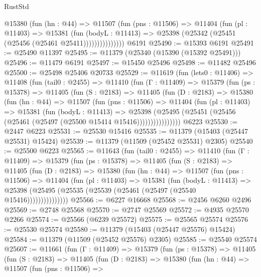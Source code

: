 \begin{lexlean}{RustStd}
\begin{coremodule}
                @15380
                  (fun (hn : @44) =>
                  @11507
                    (fun (pns : @11506) =>
                    @11404
                      (fun (pl : @11403) =>
                      @15381
                        (fun (bodyL : @11413) =>
                        @25398 (@25342 (@25451 (@25456 (@25461 @25411)))))))))))))))
    @6191
@25490 := @15393 @6191
@25491 := @25490 @11397
@25495 := @11379 (@25340 (@15390 (@15392 @25491)))
@25496 := @11479 @6191
@25497 := @15450 @25496
@25498 := @11482 @25496
@25500 := @25498 @25406 @20733
@25529 := @11619
    (fun (lets0 : @11406) =>
    @11408
      (fun (tail0 : @2455) =>
      @11410
        (fun (Γ : @11409) =>
        @15379
          (fun (ps : @15378) =>
          @11405
            (fun (S : @2183) =>
            @11405
              (fun (D : @2183) =>
              @15380
                (fun (hn : @44) =>
                @11507
                  (fun (pns : @11506) =>
                  @11404
                    (fun (pl : @11403) =>
                    @15381
                      (fun (bodyL : @11413) =>
                      @25398
                        (@25495
                          (@25451 (@25456 (@25461 (@25497 (@25500 @15414 @15416))))))))))))))))
    @6223
@25530 := @2447 @6223
@25531 := @25530 @15416
@25535 := @11379 (@15403 (@25447 @25531) @15424)
@25539 := @11379 (@11509 (@25452 @25531) @2305)
@25540 := @25500 @6223
@25565 := @11643
    (fun (tail0 : @2455) =>
    @11410
      (fun (Γ : @11409) =>
      @15379
        (fun (ps : @15378) =>
        @11405
          (fun (S : @2183) =>
          @11405
            (fun (D : @2183) =>
            @15380
              (fun (hn : @44) =>
              @11507
                (fun (pns : @11506) =>
                @11404
                  (fun (pl : @11403) =>
                  @15381
                    (fun (bodyL : @11413) =>
                    @25398 (@25495 (@25535 (@25539 (@25461 (@25497 (@25540 @15416)))))))))))))))
@25566 := @6227 @16668
@25568 := @2456 @6260 @2496
@25569 := @2748 @25568
@25570 := @2747 @25569
@25572 := @4935 @25570 @2266
@25574 := @25566 (@6239 @25572)
@25575 := @25565 @25574
@25576 := @25530 @25574
@25580 := @11379 (@15403 (@25447 @25576) @15424)
@25584 := @11379 (@11509 (@25452 @25576) @2305)
@25585 := @25540 @25574
@25607 := @11661
    (fun (Γ : @11409) =>
    @15379
      (fun (ps : @15378) =>
      @11405
        (fun (S : @2183) =>
        @11405
          (fun (D : @2183) =>
          @15380
            (fun (hn : @44) =>
            @11507
              (fun (pns : @11506) =>

\end{coremodule}
\end{lexlean}

